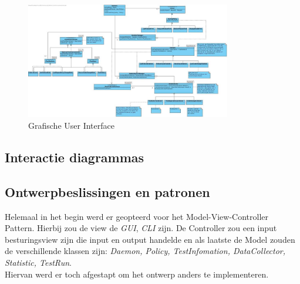 \documentclass[i1]{oss}
\begin{document}
\begin{figure}[tbp]
\begin{center}
    \includegraphics[width=0.8\textwidth]{klassendiagram}
    \caption{Grafische User Interface}
	\label{fig:gui}
\end{center}
\end{figure}

\subsection{Interactie diagrammas}
\label{ssec:Interactiedia}


\subsection{Ontwerpbeslissingen en patronen}
\label{ssec:Ontwerpbeslissingen}

Helemaal in het begin werd er geopteerd voor het Model-View-Controller Pattern. Hierbij zou de view de \textit{GUI}, \textit{CLI} zijn. De Controller zou een input besturingsview zijn die input en output handelde en als laatste de Model zouden de verschillende klassen zijn: \textit{Daemon, Policy, TestInfomation, DataCollector, Statistic, TestRun}. \\

Hiervan werd er toch afgestapt om het ontwerp anders te implementeren. \\
\end{document}
